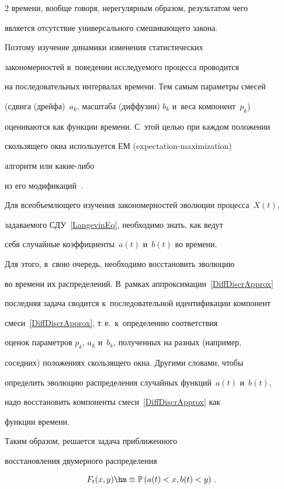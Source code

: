 \begin{multicols}{2}
времени, вообще говоря, нерегулярным образом, результатом чего 

является отсутствие универсального смешивающего закона. 

Поэтому изучение динамики изменения статистических 

закономерностей в~поведении ис\-сле\-ду\-емо\-го процесса проводится 

на последовательных интервалах времени. Тем самым па\-ра\-мет\-ры смесей 

(сдвига (дрейфа)~$a_k$, масштаба (диффузии) $b_k$ и~веса компонент~$p_k$) 

оцениваются как функции времени. С~этой целью при каждом положении 

скользящего окна используется ЕМ (expectation-maximization) 

ал\-го\-ритм или ка\-кие-ли\-бо 

из его модификаций~\cite{Korolev2011,Gorshenin2015a,Gorshenin2017}.



Для всеобъемлющего изучения закономерностей эволюции процесса~$X(t)$, 

задаваемого СДУ~\eqref{LangevinEq}, необходимо знать, как ведут 

себя случайные коэффициенты~$a(t)$ и~$b(t)$ во времени. 

Для этого, в~свою очередь, необходимо восстановить эволюцию 

во времени их распределений. В~рамках аппроксимации~\eqref{DiffDiscrApprox}

 по\-след\-няя задача сводится к~последовательной идентификации компонент 

 смеси~\eqref{DiffDiscrApprox}, т.\,е.\ к~определению соответствия 

 оценок параметров $p_k$, $a_k$ и~$b_k$, полученных на разных (например, 

 соседних) положениях сколь\-зя\-ще\-го окна. Другими словами, чтобы 

 определить эволюцию распределения случайных функций~$a(t)$ и~$b(t)$, 

 надо восстановить компоненты смеси~\eqref{DiffDiscrApprox} как 

 функции времени. 

 Таким образом, решается задача при\-бли\-жен\-но\-го 

 восстановления двумерного распределения 

 $$F_t(x,y)\hm\equiv 

 \mathbb{P}\left(a(t)<x,b(t)<y\right)\,.$$ 


\end{multicols}
